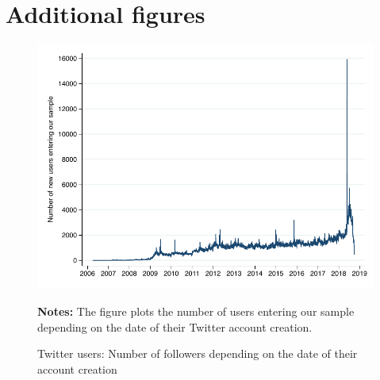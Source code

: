 \clearpage 
\pagebreak
\section{Additional figures \label{Sec:AdFigures}}

\pagebreak
\begin{figure}[h]
\begin{center}
\includegraphics[scale=1]{figures/fig_nb_new_users_daily}
\end{center}
	\begin{spacing}{0.5}
		{\footnotesize \textbf{Notes:} The figure plots the number of users entering our sample depending on the date of their Twitter account creation.}
	\end{spacing}
\vspace{.5cm}	
	\caption{Twitter users: Number of followers depending on the date of their account creation}
	\label{fig:fig_nb_new_users_daily}
\end{figure}


